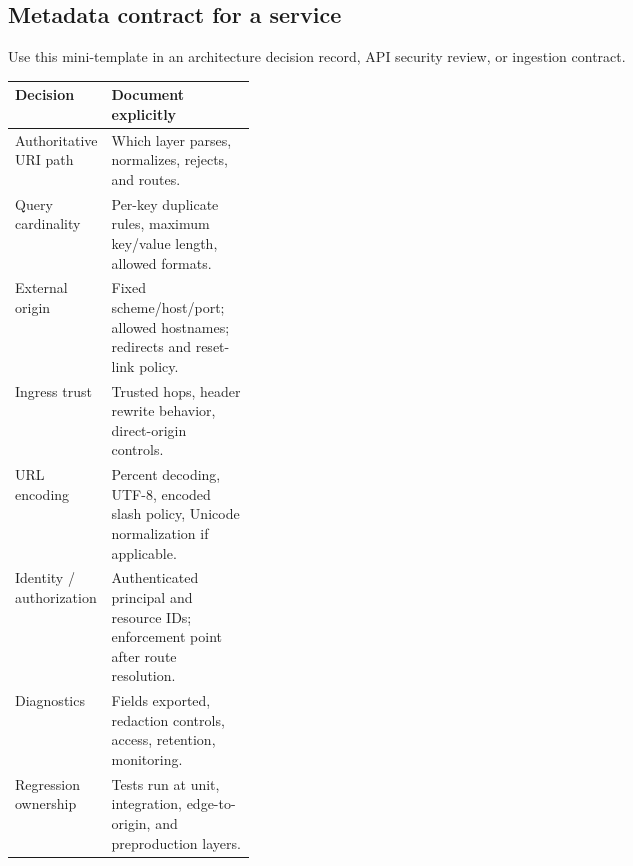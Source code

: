 \documentclass[10pt,letterpaper,oneside]{article}
\begin{document}
\subsection{Metadata contract for a service}
Use this mini-template in an architecture decision record, API security review, or ingestion contract.
\begin{table}[h!]
\centering\small
\begin{tabularx}{\linewidth}{P{0.28\linewidth}Y}
\toprule\textbf{Decision} & \textbf{Document explicitly}\\\midrule
Authoritative URI path & Which layer parses, normalizes, rejects, and routes.\\
Query cardinality & Per-key duplicate rules, maximum key/value length, allowed formats.\\
External origin & Fixed scheme/host/port; allowed hostnames; redirects and reset-link policy.\\
Ingress trust & Trusted hops, header rewrite behavior, direct-origin controls.\\
URL encoding & Percent decoding, UTF-8, encoded slash policy, Unicode normalization if applicable.\\
Identity / authorization & Authenticated principal and resource IDs; enforcement point after route resolution.\\
Diagnostics & Fields exported, redaction controls, access, retention, monitoring.\\
Regression ownership & Tests run at unit, integration, edge-to-origin, and preproduction layers.\\
\bottomrule
\end{tabularx}
\end{table}
\end{document}
